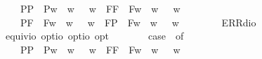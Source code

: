 \begin{isabellebody}
\ \ \ \ {\isacharparenleft}P{\isacharparenleft}{\isasymalpha}{\isacharparenright}{\isacharcomma}P{\isacharparenleft}{\isasymbeta}{\isacharparenright}{\isacharparenright}\ {\isasymRightarrow}\ P{\isacharparenleft}{\isasymlambda}w{\isachardot}\ {\isasymalpha}\ w\ {\isasymor}\ {\isasymbeta}\ w{\isacharparenright}\ {\isacharbar}\ {\isacharparenleft}F{\isacharparenleft}{\isasymalpha}{\isacharparenright}{\isacharcomma}F{\isacharparenleft}{\isasymbeta}{\isacharparenright}{\isacharparenright}\ {\isasymRightarrow}\ F{\isacharparenleft}{\isasymlambda}w{\isachardot}\ {\isasymalpha}\ w\ {\isasymor}\ {\isasymbeta}\ w{\isacharparenright}\ {\isacharbar}\ \isanewline
\ \ \ \ {\isacharparenleft}P{\isacharparenleft}{\isasymalpha}{\isacharparenright}{\isacharcomma}F{\isacharparenleft}{\isasymbeta}{\isacharparenright}{\isacharparenright}\ {\isasymRightarrow}\ F{\isacharparenleft}{\isasymlambda}w{\isachardot}\ {\isasymalpha}\ w\ {\isasymor}\ {\isasymbeta}\ w{\isacharparenright}\ {\isacharbar}\ {\isacharparenleft}F{\isacharparenleft}{\isasymalpha}{\isacharparenright}{\isacharcomma}P{\isacharparenleft}{\isasymbeta}{\isacharparenright}{\isacharparenright}\ {\isasymRightarrow}\ F{\isacharparenleft}{\isasymlambda}w{\isachardot}\ {\isasymalpha}\ w\ {\isasymor}\ {\isasymbeta}\ w{\isacharparenright}\ {\isacharbar}\ \isanewline
\ \ \ \ {\isacharunderscore}\ {\isasymRightarrow}\ ERR{\isacharparenleft}dio{\isacharparenright}{\isachardoublequoteclose}\ \ \isanewline
\isanewline
\ \isamarkupfalse%
\ equiv{\isacharcolon}{\isacharcolon}{\isachardoublequoteopen}io\ opt{\isasymRightarrow}io\ opt{\isasymRightarrow}io\ opt{\isachardoublequoteclose}\ {\isacharparenleft}\ {\isachardoublequoteopen}\isactrlbold {\isasymequiv}{\isachardoublequoteclose}\ {}{}{\isacharparenright}\ \ {\isachardoublequoteopen}{\isasymphi}\ \isactrlbold {\isasymequiv}\ {\isasympsi}{\isasymequiv}\ case\ {\isacharparenleft}{\isasymphi}{\isacharcomma}{\isasympsi}{\isacharparenright}\ of\isanewline
\ \ \ \ {\isacharparenleft}P{\isacharparenleft}{\isasymalpha}{\isacharparenright}{\isacharcomma}P{\isacharparenleft}{\isasymbeta}{\isacharparenright}{\isacharparenright}\ {\isasymRightarrow}\ P{\isacharparenleft}{\isasymlambda}w{\isachardot}\ {\isasymalpha}\ w\ {\isasymlongleftrightarrow}\ {\isasymbeta}\ w{\isacharparenright}\ {\isacharbar}\ {\isacharparenleft}F{\isacharparenleft}{\isasymalpha}{\isacharparenright}{\isacharcomma}F{\isacharparenleft}{\isasymbeta}{\isacharparenright}{\isacharparenright}\ {\isasymRightarrow}\ F{\isacharparenleft}{\isasymlambda}w{\isachardot}\ {\isasymalpha}\ w\ {\isasymlongleftrightarrow}\ {\isasymbeta}\ w{\isacharparenright}\ {\isacharbar}\ \isanewline

\end{isabellebody}
